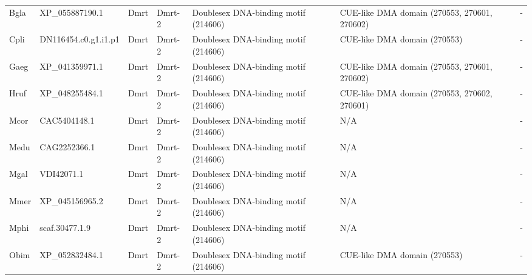 \documentclass[../main.tex]{subfiles}
\begin{document}
\begin{landscape}
\begin{longtable}{lllllll}
		Bgla           & XP\_055887190.1       & Dmrt           & Dmrt-2              & Doublesex DNA-binding motif (214606)        & CUE-like DMA domain (270553, 270601, 270602)                           & -                    \\
		Cpli           & DN116454.c0.g1.i1.p1  & Dmrt           & Dmrt-2              & Doublesex DNA-binding motif (214606)        & CUE-like DMA domain (270553)                                           & -                    \\
		Gaeg           & XP\_041359971.1       & Dmrt           & Dmrt-2              & Doublesex DNA-binding motif (214606)        & CUE-like DMA domain (270553, 270601, 270602)                           & -                    \\
		Hruf           & XP\_048255484.1       & Dmrt           & Dmrt-2              & Doublesex DNA-binding motif (214606)        & CUE-like DMA domain (270553, 270602, 270601)                           & -                    \\
		Mcor           & CAC5404148.1          & Dmrt           & Dmrt-2              & Doublesex DNA-binding motif (214606)        & N/A                                                                    & -                    \\
		Medu           & CAG2252366.1          & Dmrt           & Dmrt-2              & Doublesex DNA-binding motif (214606)        & N/A                                                                    & -                    \\
		Mgal           & VDI42071.1            & Dmrt           & Dmrt-2              & Doublesex DNA-binding motif (214606)        & N/A                                                                    & -                    \\
		Mmer           & XP\_045156965.2       & Dmrt           & Dmrt-2              & Doublesex DNA-binding motif (214606)        & N/A                                                                    & -                    \\
		Mphi           & scaf.30477.1.9        & Dmrt           & Dmrt-2              & Doublesex DNA-binding motif (214606)        & N/A                                                                    & -                    \\
		Obim           & XP\_052832484.1       & Dmrt           & Dmrt-2              & Doublesex DNA-binding motif (214606)        & CUE-like DMA domain (270553)                                           & -                    \\

\end{longtable}
\end{landscape}
\end{document}
